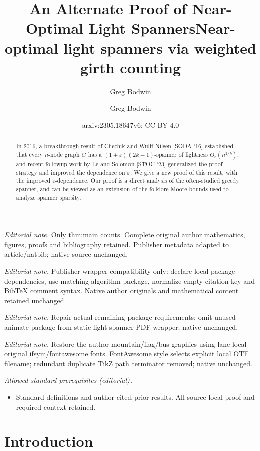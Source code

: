 \documentclass{article}\usepackage[a4paper,margin=20mm]{geometry}
\title{An Alternate Proof of Near-Optimal Light Spanners}
\author{Greg Bodwin}\date{}
\title{Near-optimal light spanners via weighted girth counting}
\author{Greg Bodwin}
\date{arxiv:2305.18647v6; CC BY 4.0}
\newcommand{\eps}{\varepsilon}
\begin{document}
\maketitle
\noindent\textit{Editorial note.} Only thm:main counts. Complete original author mathematics, figures, proofs and bibliography retained. Publisher metadata adapted to article/natbib; native source unchanged.\par\medskip
\noindent\textit{Editorial note.} Publisher wrapper compatibility only: declare local package dependencies, use matching algorithm package, normalize empty citation key and BibTeX comment syntax. Native author originals and mathematical content retained unchanged.\par\medskip
\noindent\textit{Editorial note.} Repair actual remaining package requirements; omit unused animate package from static light-spanner PDF wrapper; native unchanged.\par\medskip
\noindent\textit{Editorial note.} Restore the author mountain/flag/bus graphics using lane-local original ifsym/fontawesome fonts. FontAwesome style selects explicit local OTF filename; redundant duplicate TikZ path terminator removed; native unchanged.\par\medskip
\noindent\textit{Allowed standard prerequisites (editorial).}\begin{itemize}
\item Standard definitions and author-cited prior results. All source-local proof and required context retained.
\end{itemize}\medskip

\maketitle

\begin{abstract}
In 2016, a breakthrough result of Chechik and Wulff-Nilsen [SODA '16] established that every $n$-node graph $G$ has a $(1+\eps)(2k-1)$-spanner of lightness $O_{\eps}(n^{1/k})$, and recent followup work by Le and Solomon [STOC '23] generalized the proof strategy and improved the dependence on $\eps$.
We give a new proof of this result, with the improved $\eps$-dependence.
Our proof is a direct analysis of the often-studied greedy spanner, and can be viewed as an extension of the folklore Moore bounds used to analyze spanner sparsity.
\end{abstract}

\section{Introduction}
\end{document}

